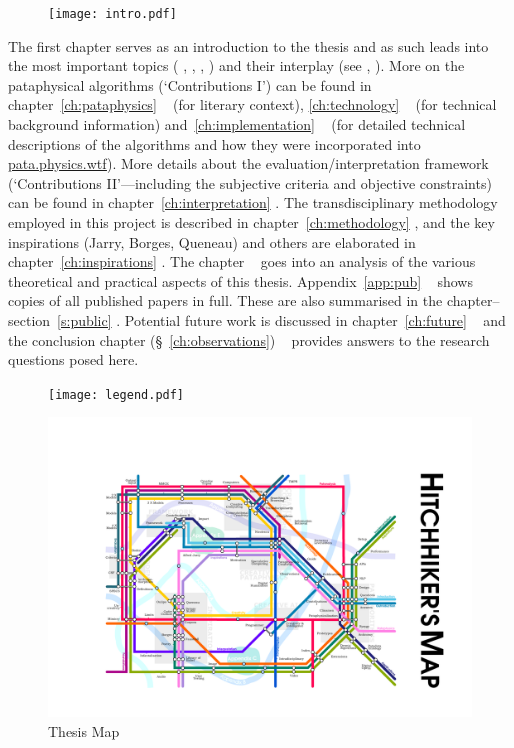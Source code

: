 \vspace{1cm}
\begin{figure}[!htb]
\centering
  \texttt{[image: intro.pdf]}
\end{figure}

{\sffamily 

The first chapter serves as an introduction to the thesis and as such leads into the most important topics ( \pata,  \creat,  \tech,  \eval) and their interplay (see  \found,  \inter). More on the pataphysical algorithms (`Contributions I') can be found in chapter~\ref{ch:pataphysics} \pata~ (for literary context), \ref{ch:technology} \tech~ (for technical background information) and~\ref{ch:implementation} \imple~ (for detailed technical descriptions of the algorithms and how they were incorporated into \url{pata.physics.wtf}). More details about the evaluation/interpretation framework (`Contributions II'---including the subjective criteria and objective constraints) can be found in chapter~\ref{ch:interpretation} \inter. The transdisciplinary methodology employed in this project is described in chapter~\ref{ch:methodology} \metho, and the key inspirations (Jarry, Borges, Queneau) and others are elaborated in chapter~\ref{ch:inspirations} \inspi. The  chapter \anal~ goes into an analysis of the various theoretical and practical aspects of this thesis. Appendix~\ref{app:pub} \appe~ shows copies of all published papers in full. These are also summarised in the  chapter--section~\ref{s:public} \appli. Potential future work is discussed in chapter~\ref{ch:future} \aspi~ and the conclusion chapter (§~\ref{ch:observations}) \outro~ provides answers to the research questions posed here.
}

\begin{figure}[!htb]
\centering
  \texttt{[image: legend.pdf]}
\end{figure}

\begin{figure}[!p]
\centering
  \includegraphics[width=\linewidth]{map}
\captionsetup{textformat=empty,labelformat=blank}
\caption[Thesis Map]{Thesis Map}
\label{map}
\end{figure}

\stopcontents[chapters]

